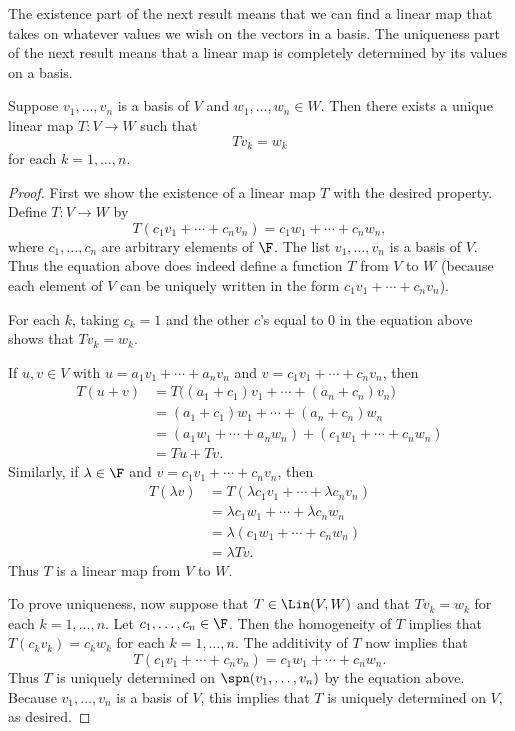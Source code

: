 The existence part of the next result means that we can find a linear map that
takes on whatever values we wish on the vectors in a basis. The uniqueness part
of the next result means that a linear map is completely determined by its
values on a basis.

\begin{result}\label{ax:3.4}
Suppose $v_1,\dots,v_n$ is a basis of $V$ and $w_1,\dots,w_n\in W$. Then there
exists a unique linear map $T\colon V\to W$ such that
\[ Tv_k=w_k \]
for each $k=1,\dots,n$.
\end{result}

\begin{proof}
First we show the existence of a linear map $T$ with the desired property.
Define $T\colon V\to W$ by
\[ T(c_1v_1+\cdots+c_nv_n)=c_1w_1+\cdots+c_nw_n, \]
where $c_1,\dots,c_n$ are arbitrary elements of $\F$. The list
$v_1,\dots,v_n$ is a basis of $V$. Thus the equation above does indeed define a
function $T$ from $V$ to $W$ (because each element of $V$ can be uniquely
written in the form $c_1v_1+\cdots+c_nv_n$).

For each $k$, taking $c_k=1$ and the other $c$'s equal to $0$ in the equation
above shows that $Tv_k=w_k$.

If $u,v\in V$ with $u=a_1v_1+\cdots+a_nv_n$ and $v=c_1v_1+\cdots+c_nv_n$, then
\begin{align*}
T(u+v) &= T\bigl((a_1+c_1)v_1+\cdots+(a_n+c_n)v_n\bigr)\\
       &= (a_1+c_1)w_1+\cdots+(a_n+c_n)w_n\\
       &= (a_1w_1+\cdots+a_nw_n)+(c_1w_1+\cdots+c_nw_n)\\
       &= Tu+Tv.
\end{align*}
Similarly, if $\lambda\in\F$ and $v=c_1v_1+\cdots+c_nv_n$, then
\begin{align*}
T(\lambda v) &= T(\lambda c_1v_1+\cdots+\lambda c_nv_n)\\
             &= \lambda c_1w_1+\cdots+\lambda c_nw_n\\
             &= \lambda(c_1w_1+\cdots+c_nw_n)\\
             &= \lambda Tv.
\end{align*}
Thus $T$ is a linear map from $V$ to $W$.

To prove uniqueness, now suppose that $T\in\Lin(V,W)$ and that $Tv_k=w_k$ for
each $k=1,\dots,n$. Let $c_1,\dots,c_n\in\F$. Then the homogeneity of $T$
implies that $T(c_kv_k)=c_kw_k$ for each $k=1,\dots,n$. The additivity of $T$
now implies that
\[ T(c_1v_1+\cdots+c_nv_n)=c_1w_1+\cdots+c_nw_n. \]
Thus $T$ is uniquely determined on $\spn(v_1,\dots,v_n)$ by the equation above.
Because $v_1,\dots,v_n$ is a basis of $V$, this implies that $T$ is uniquely
determined on $V$, as desired.
\end{proof}

